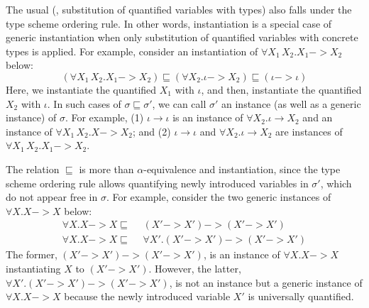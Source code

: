 The usual  (\ie, substitution of quantified variables
with types) also falls under the type scheme ordering rule. In other words,
instantiation is a special case of generic instantiation when only
substitution of quantified variables
with concrete types is applied. For example,
consider an instantiation of $\forall X_1\,X_2.X_1 -> X_2$ below:
\[ (\forall X_1\,X_2.X_1 -> X_2) \sqsubseteq
   (\forall X_2.\iota -> X_2) \sqsubseteq (\iota -> \iota)
\] 
Here, we instantiate the quantified $X_1$ with $\iota$,
and then, instantiate the quantified $X_2$ with $\iota$.
In such cases of $\sigma\sqsubseteq\sigma'$, we can call $\sigma'$ an instance
(as well as a generic instance) of $\sigma$. For example, (1) $\iota\to\iota$ is
an instance of $\forall X_2.\iota\to X_2$ and an instance of $\forall X_1\,X_2.X->X_2$; and (2)
$\iota\to\iota$ and $\forall X_2.\iota\to X_2$ are instances of
$\forall X_1\,X_2.X_1->X_2$.

The relation $\sqsubseteq$
is more than $\alpha$-equivalence and instantiation, since
the type scheme ordering rule allows quantifying newly introduced
variables in $\sigma'$, which do not appear free in $\sigma$.
For example, consider the two generic instances of $\forall X.X -> X$ below:
\begin{align*}
\forall X.X -> X \sqsubseteq\;\,& (X'-> X')-> (X'-> X') \\
\forall X.X -> X \sqsubseteq\;\,& \forall X'.(X'-> X')-> (X'-> X')
\end{align*}
The former, $(X'-> X')-> (X'-> X')$, is an instance of $\forall X.X -> X$
instantiating $X$ to $(X'-> X')$. However, the latter,
$\forall X'.(X'-> X')-> (X'-> X')$, is not an instance
but a generic instance of $\forall X.X-> X$ because
the newly introduced variable $X'$ is universally quantified.

